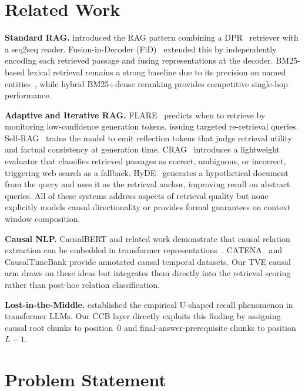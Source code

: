 \documentclass[10pt,twocolumn]{article}
\newcommand{\parasep}{\vspace{2pt}}
\newcommand{\secvspace}{\vspace{-4pt}}
\begin{document}
\section{Related Work}\label{sec:related}
\secvspace

\noindent\textbf{Standard RAG.}
\citet{lewis2020retrieval} introduced the RAG pattern combining a
DPR~\citep{karpukhin2020dense} retriever with a seq2seq reader.
Fusion-in-Decoder (FiD)~\citep{izacard2021leveraging} extended this by
independently encoding each retrieved passage and fusing representations at the
decoder.  BM25-based lexical retrieval remains a strong baseline due to its
precision on named entities~\citep{robertson2009bm25}, while hybrid
BM25+dense reranking provides competitive single-hop performance.

\parasep
\noindent\textbf{Adaptive and Iterative RAG.}
FLARE~\citep{jiang2023active} predicts when to retrieve by monitoring low-confidence
generation tokens, issuing targeted re-retrieval queries.  Self-RAG~\citep{asai2023self}
trains the model to emit reflection tokens that judge retrieval utility and
factual consistency at generation time.  CRAG~\citep{yan2024corrective} introduces
a lightweight evaluator that classifies retrieved passages as correct, ambiguous,
or incorrect, triggering web search as a fallback.  HyDE~\citep{gao2022precise}
generates a hypothetical document from the query and uses it as the retrieval
anchor, improving recall on abstract queries.  All of these systems address
aspects of retrieval quality but none explicitly models causal directionality or
provides formal guarantees on context window composition.

\parasep
\noindent\textbf{Causal NLP.}
CausalBERT and related work demonstrate that causal relation extraction can
be embedded in transformer representations~\citep{li2021causalbert}.
CATENA~\citep{mirza2016catena} and CausalTimeBank provide annotated causal
temporal datasets.  Our TVE causal arm draws on these ideas but integrates
them directly into the retrieval scoring rather than post-hoc relation
classification.

\parasep
\noindent\textbf{Lost-in-the-Middle.}
\citet{liu2023lost} established the empirical U-shaped recall phenomenon in
transformer LLMs.  Our CCB layer directly exploits this finding by assigning
causal root chunks to position~0 and final-answer-prerequisite chunks to
position~$L-1$.

\section{Problem Statement}\label{sec:problem}
\secvspace
\end{document}
